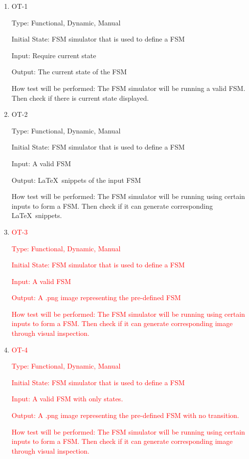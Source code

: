 \documentclass[12pt, titlepage]{article}
\begin{document}
\begin{enumerate}

\item{OT-1\\}

Type: Functional, Dynamic, Manual
					
Initial State: FSM simulator that is used to define a FSM
					
Input: Require current state
					
Output: The current state of the FSM
					
How test will be performed: The FSM simulator will be running a valid FSM. Then check if there is 
current state displayed.
					
\item{OT-2\\}

Type: Functional, Dynamic, Manual
					
Initial State: FSM simulator that is used to define a FSM
					
Input: A valid FSM
					
Output: \LaTeX\ snippets of the input FSM 
					
How test will be performed: The FSM simulator will be running using certain inputs to form a FSM. Then check if it can 
generate corresponding \LaTeX\ snippets.

\item{\textcolor{red}{OT-3}\\}

  \textcolor{red}{Type: Functional, Dynamic, Manual}
    
    \textcolor{red}{Initial State: FSM simulator that is used to define a FSM}

    \textcolor{red}{Input: A valid FSM}

    \textcolor{red}{Output: A .png image representing the pre-defined FSM}

    \textcolor{red}{How test will be performed: The FSM simulator will be
      running using certain inputs to form a FSM. Then check if it can generate
      corresponding image through visual inspection.}

    \item{\textcolor{red}{OT-4}\\}

    \textcolor{red}{Type: Functional, Dynamic, Manual}
    
    \textcolor{red}{Initial State: FSM simulator that is used to define a FSM}

    \textcolor{red}{Input: A valid FSM with only states.}

    \textcolor{red}{Output: A .png image representing the pre-defined FSM with
      no transition.}

    \textcolor{red}{How test will be performed: The FSM simulator will be
      running using certain inputs to form a FSM. Then check if it can generate
      corresponding image through visual inspection.}

\end{enumerate}
\end{document}
